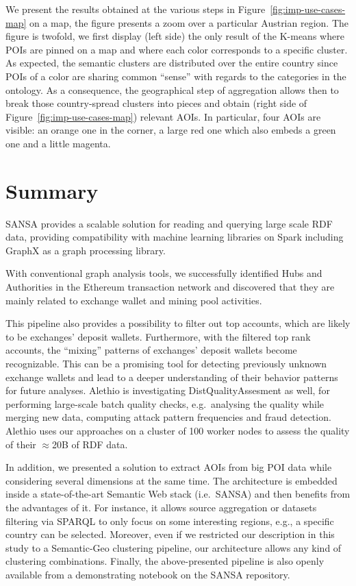 We present the results obtained at the various steps in Figure~\ref{fig:imp-use-cases-map} on a map, the figure presents a zoom over a particular Austrian region. 
The figure is twofold, we first display (left side) the only result of the K-means where \gls{POI}s are pinned on a map and where each color corresponds to a specific cluster. 
As expected, the semantic clusters are distributed over the entire country since \gls{POI}s of a color are sharing common ``sense'' with regards to the categories in the ontology. 
As a consequence, the geographical step of aggregation allows then to break those country-spread clusters into pieces and obtain (right side of Figure~\ref{fig:imp-use-cases-map}) relevant \gls{AOI}s. 
In particular, four \gls{AOI}s are visible: an orange one in the corner, a large red one which also embeds a green one and a little magenta.


\section{Summary}
SANSA provides a scalable solution for reading and querying large scale \gls{RDF} data, providing compatibility with machine learning libraries on Spark including GraphX as a graph processing library.

With conventional graph analysis tools, we successfully identified Hubs and Authorities in the Ethereum transaction network and discovered that they are mainly related to exchange wallet and mining pool activities.

This pipeline also provides a possibility to filter out top accounts, which are likely to be exchanges' deposit wallets. 
Furthermore, with the filtered top rank accounts, the ``mixing'' patterns of exchanges' deposit wallets become recognizable. 
This can be a promising tool for detecting previously unknown exchange wallets and lead to a deeper understanding of their behavior patterns for future analyses.
Alethio is investigating DistQualityAssesment as well, for performing large-scale batch quality checks, e.g.~analysing the quality while merging new data, computing attack pattern frequencies and fraud detection. 
Alethio uses our approaches on a cluster of 100 worker nodes to assess the quality of their $\approx$20B of RDF data.

In addition, we presented a solution to extract \gls{AOI}s from big POI data while considering several dimensions at the same time. The architecture is embedded inside a state-of-the-art Semantic Web stack (i.e.~SANSA) and then benefits from the advantages of it. For instance, it allows source aggregation or datasets filtering via \gls{SPARQL} to only focus on some interesting regions, e.g., a specific country can be selected. 
Moreover, even if we restricted our description in this study to a Semantic-Geo clustering pipeline, our architecture allows any kind of clustering combinations.
Finally, the above-presented pipeline is also openly available from a demonstrating notebook on the SANSA repository.
